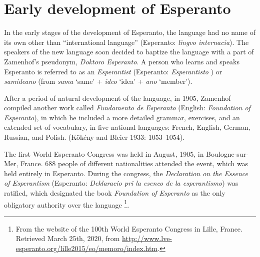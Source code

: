 
\section{Early development of Esperanto}

In the early stages of the development of Esperanto, the language had no name of its own other than ``international language'' (Esperanto: \textit{lingvo internacia}).
The speakers of the new language soon decided to baptize the language with a part of Zamenhof's pseudonym, \textit{Doktoro Esperanto}.
A person who learns and speaks Esperanto is referred to as an \textit{Esperantist} (Esperanto: \textit{Esperantisto}%
) or \textit{samideano} (from \textit{sama} `same' + \textit{ideo} `idea' + \textit{ano} `member').

After a period of natural development of the language, in 1905, Zamenhof compiled another work called \textit{Fundamento de Esperanto} (English: \textit{Foundation of Esperanto}), in which he included a more detailed grammar, exercises, and an extended set of vocabulary, in five national languages: French, English, German, Russian, and Polish.
(Kökény and Bleier 1933: 1053--1054).

The first World Esperanto Congress was held in August, 1905, in Boulogne-sur-Mer, France.
688 people of different nationalities attended the event, which was held entirely in Esperanto.
During the congress, the \textit{Declaration on the Essence of Esperantism} (Esperanto: \textit{Deklaracio pri la esenco de la esperantismo}) was ratified, which designated the book \textit{Foundation of Esperanto} as the only obligatory authority over the language%
\footnote{From the website of the 100th World Esperanto Congress in Lille, France. Retrieved March 25th, 2020, from \url{http://www.lve-esperanto.org/lille2015/eo/memoro/index.htm}.}.

